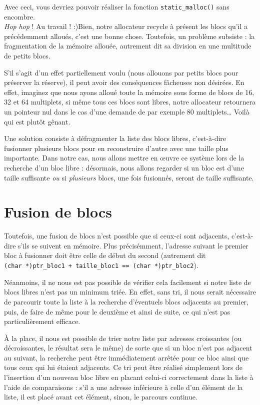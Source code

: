 \documentclass[]{article}
\begin{document}
Avec ceci, vous devriez pouvoir réaliser la fonction
\texttt{static\_malloc()} sans encombre.\\
\emph{Hop} \emph{hop} ! Au travail ! :)Bien, notre allocateur recycle à
présent les blocs qu'il a précédemment alloués, c'est une bonne chose.
Toutefois, un problème subsiste : la fragmentation de la mémoire
allouée, autrement dit sa division en une multitude de petits blocs.

S'il s'agit d'un effet partiellement voulu (nous allouons par petits
blocs pour préserver la réserve), il peut avoir des conséquences
fâcheuses non désirées. En effet, imaginez que nous ayons alloué toute
la mémoire sous forme de blocs de 16, 32 et 64 multiplets, si même tous
ces blocs sont libres, notre allocateur retournera un pointeur nul dans
le cas d'une demande de par exemple 80 multiplets\ldots{} Voilà qui est
plutôt gênant.

Une solution consiste à défragmenter la liste des blocs libres,
c'est-à-dire fusionner plusieurs blocs pour en reconstruire d'autre avec
une taille plus importante. Dans notre cas, nous allons mettre en œuvre
ce système lors de la recherche d'un bloc libre : désormais, nous allons
regarder si un bloc est d'une taille suffisante \emph{ou} si
\emph{plusieurs} blocs, une fois fusionnés, seront de taille suffisante.

\section{Fusion de blocs}\label{fusion-de-blocs}

Toutefois, une fusion de blocs n'est possible que si ceux-ci sont
adjacents, c'est-à-dire s'ils se suivent en mémoire. Plus précisémment,
l'adresse suivant le premier bloc à fusionner doit être celle de début
du second (autrement dit
\texttt{(char\ *)ptr\_bloc1\ +\ taille\_bloc1\ ==\ (char\ *)ptr\_bloc2}).

Néanmoins, il ne nous est pas possible de vérifier cela facilement si
notre liste de blocs libres n'est pas un minimum triée. En effet, sans
tri, il nous serait nécessaire de parcourir toute la liste à la
recherche d'éventuels blocs adjacents au premier, puis, de faire de même
pour le deuxième et ainsi de suite, ce qui n'est pas particulièrement
efficace.

À la place, il nous est possible de trier notre liste par adresses
croissantes (ou décroissantes, le résultat sera le même) de sorte que si
un bloc n'est pas adjacent au suivant, la recherche peut être
immédiatement arrêtée pour ce bloc ainsi que tous ceux qui lui étaient
adjacents. Ce tri peut être réalisé simplement lors de l'insertion d'un
nouveau bloc libre en placant celui-ci correctement dans la liste à
l'aide de comparaisons : s'il a une adresse inférieure à celle d'un
élément de la liste, il est placé avant cet élément, sinon, le parcours
continue.
\end{document}
